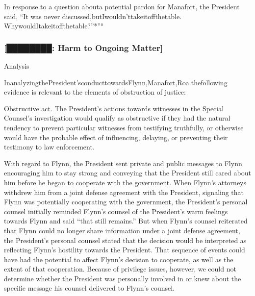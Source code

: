 In response to a question abouta potential pardon for Manafort, the President said, “It was never discussed,butIwouldn'ttakeitoffthetable. WhywouldItakeitoffthetable?”*”°

\subsubsection{[████████: Harm to Ongoing Matter]}








Analysis

InanalyzingthePresident'sconducttowardsFlynn,Manafort,Roa.thefollowing evidence is relevant to the elements of obstruction of justice:

Obstructive act. The President's actions towards witnesses in the Special Counsel's investigation would qualify as obstructive if they had the natural tendency to prevent particular witnesses from testifying truthfully, or otherwise would have the probable effect of influencing, delaying, or preventing their testimony to law enforcement.

With regard to Flynn, the President sent private and public messages to Flynn encouraging him to stay strong and conveying that the President still cared about him before he began to cooperate with the government. When Flynn's attorneys withdrew him from a joint defense agreement with the President, signaling that Flynn was potentially cooperating with the government, the President's personal counsel initially reminded Flynn's counsel of the President's warm feelings towards Flynn and said “that still remains.” But when Flynn's counsel reiterated that Flynn could no longer share information under a joint defense agreement, the President's personal counsel stated that the decision would be interpreted as reflecting Flynn's hostility towards the President. That sequence of events could have had the potential to affect Flynn's decision to cooperate, as well as the extent of that cooperation. Because of privilege issues, however, we could not determine whether the President was personally involved in or knew about the specific message his counsel delivered to Flynn's counsel.

